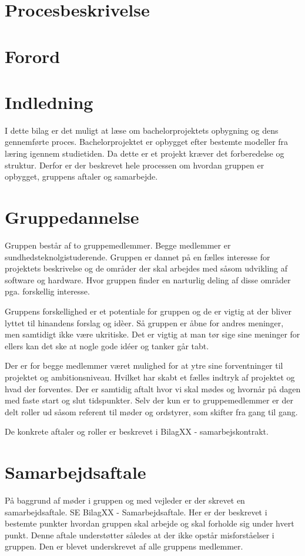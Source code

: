 
\chapter*{Procesbeskrivelse}
\newpage
\tableofcontents

 \chapter{Forord} 
 \chapter{Indledning}
 I dette bilag er det muligt at læse om bachelorprojektets opbygning og dens gennemførte proces. Bachelorprojektet er opbygget efter bestemte modeller fra læring igennem studietiden. Da dette er et projekt kræver det forberedelse og struktur. Derfor er der beskrevet hele processen om hvordan gruppen er opbygget, gruppens aftaler og samarbejde.

\chapter{Gruppedannelse}
Gruppen består af to gruppemedlemmer. Begge medlemmer er sundhedsteknolgistuderende. Gruppen er dannet på en fælles interesse for projektets beskrivelse og de områder der skal arbejdes med såsom udvikling af software og hardware. Hvor gruppen finder en narturlig deling af disse områder pga. forskellig interesse. 

Gruppens forskellighed er et potentiale for gruppen og de er vigtig at der bliver lyttet til hinandens forslag og idèer. Så gruppen er åbne for andres meninger, men samtidigt ikke være ukritiske. Det er vigtig at man tør sige sine meninger for ellers kan det ske at nogle gode idéer og tanker går tabt.

Der er for begge medlemmer været mulighed for at ytre sine forventninger til projektet og ambitionsniveau. Hvilket har skabt et fælles indtryk af projektet og hvad der forventes. Der er samtidig aftalt hvor vi skal mødes og hvornår på dagen med faste start og slut tidspunkter. Selv der  kun er to gruppemedlemmer er der delt roller ud såsom referent til møder og ordstyrer, som skifter fra gang til gang.

De konkrete aftaler og roller er beskrevet i BilagXX - samarbejskontrakt. 

\chapter{Samarbejdsaftale}
På baggrund af møder i gruppen og med vejleder er der skrevet en samarbejdsaftale. SE BilagXX - Samarbejdsaftale. Her er der beskrevet i bestemte punkter hvordan gruppen skal  arbejde og skal forholde sig under hvert punkt. Denne aftale understøtter således at der ikke opstår misforståelser i gruppen. Den er blevet underskrevet af alle gruppens medlemmer.  


